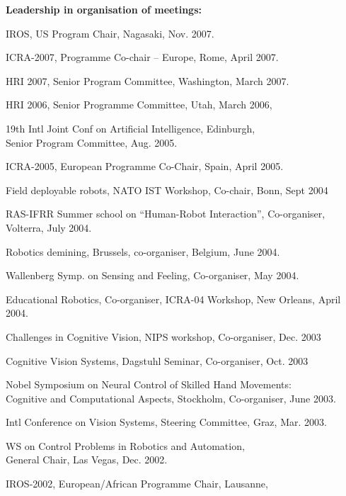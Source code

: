 \documentclass{article}
\begin{document}
\begin{cv}
\begin{cvlist}{\bf Leadership in organisation of meetings:}
		\item IROS, US Program Chair, Nagasaki, \cftdotfill{\cftdotsep} Nov. 2007.
		\item ICRA-2007, Programme Co-chair -- Europe, Rome, \cftdotfill{\cftdotsep}
		April 2007.
		\item HRI 2007, Senior Program Committee, Washington, \cftdotfill{\cftdotsep}
		March 2007.
		\item HRI 2006, Senior Programme Committee, Utah, \cftdotfill{\cftdotsep}
		March 2006,
		\item 19th Intl Joint Conf on Artificial Intelligence, Edinburgh,\\ Senior
		Program Committee, \cftdotfill{\cftdotsep} Aug. 2005.
		\item ICRA-2005, European Programme Co-Chair, Spain, \cftdotfill{\cftdotsep}
		April 2005.
		\item Field deployable robots, NATO IST Workshop, Co-chair, Bonn,
		\cftdotfill{\cftdotsep} Sept 2004
		\item RAS-IFRR Summer school on ``Human-Robot Interaction'', Co-organiser,
		\\Volterra, \cftdotfill{\cftdotsep} July 2004.
		\item Robotics demining, Brussels, co-organiser, Belgium,
		\cftdotfill{\cftdotsep} June 2004.
		\item Wallenberg Symp. on Sensing and Feeling, Co-organiser,
		\cftdotfill{\cftdotsep} May 2004.
		\item Educational Robotics, Co-organiser, ICRA-04 Workshop, New Orleans,
		\cftdotfill{\cftdotsep} April 2004.
		\item Challenges in Cognitive Vision, NIPS workshop, Co-organiser,
		\cftdotfill{\cftdotsep} Dec. 2003
		\item Cognitive Vision Systems, Dagstuhl Seminar, Co-organiser,
		\cftdotfill{\cftdotsep} Oct. 2003
		\item Nobel Symposium on Neural Control of Skilled Hand Movements:\\ Cognitive
		and Computational Aspects, Stockholm, Co-organiser, \cftdotfill{\cftdotsep}
		June 2003.
		\item Intl Conference on Vision Systems, Steering Committee, Graz,
		\cftdotfill{\cftdotsep} Mar. 2003.
		\item WS on Control Problems in Robotics and Automation, \\General Chair, Las
		Vegas, \cftdotfill{\cftdotsep}Dec. 2002.
		\item IROS-2002, European/African Programme Chair, Lausanne,

\end{cvlist}
\end{cv}
\end{document}
